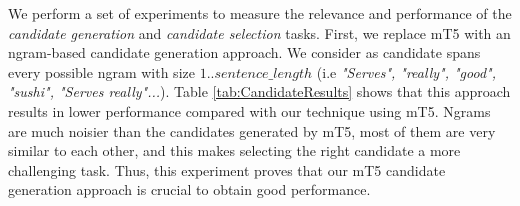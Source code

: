 \documentclass[11pt]{article}
\begin{document}
\begin{table}[htb]
    \centering
\caption{F1 scores for different candidate generation and candidate selection
methods.}
\label{tab:CandidateResults}
\end{table}


We perform a set of experiments to measure the relevance and performance of the
\emph{candidate generation} and \emph{candidate selection} tasks.  First, we replace mT5 with
an ngram-based candidate generation approach. We consider as candidate spans
every possible ngram with size $1..sentence\_length$ (i.e \textit{"Serves",
"really", "good", "sushi", "Serves really"...}). Table
\ref{tab:CandidateResults} shows that this approach results in lower
performance compared with our technique using mT5. Ngrams are
much noisier than the candidates generated by mT5, most of them 
are very similar to each other, and this makes selecting the right candidate a more challenging task. Thus, this experiment proves that our mT5 candidate
generation approach is crucial to obtain good performance.
\end{document}
